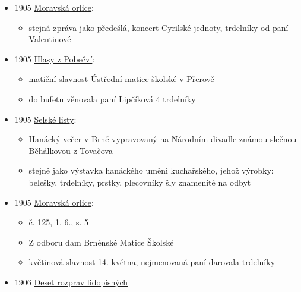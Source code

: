 \begin{itemize}
  \begin{itemize}
  \tightlist
  \item
    Dopisy. Ze Židlochovic.
  \item
    v neděli 30. dubna pořádala Cyrilská jednota koncert, bylo tam
    jídlo, paní Valentinová věnovala trdelníky
  \end{itemize}
\item
  1905
  \href{https://www.digitalniknihovna.cz/mzk/uuid/uuid:e7a3e0e0-6265-11df-9a5a-000d606f5dc6}{Moravská
  orlice}:

  \begin{itemize}
  \tightlist
  \item
    stejná zpráva jako předešlá, koncert Cyrilské jednoty, trdelníky od
    paní Valentinové
  \end{itemize}
\item
  1905
  \href{https://www.digitalniknihovna.cz/vkol/uuid/uuid:21149904-31a4-41d4-b6ba-93c1f08dc0d4}{Hlasy
  z Pobečví}:

  \begin{itemize}
  \tightlist
  \item
    matiční slavnost Ústřední matice školské v Přerově
  \item
    do bufetu věnovala paní Lipčíková 4 trdelníky
  \end{itemize}
\item
  1905
  \href{https://www.digitalniknihovna.cz/vkol/uuid/uuid:7df329c4-8e40-4856-b414-4b12b31f9d3c}{Selské
  listy}:

  \begin{itemize}
  \tightlist
  \item
    Hanácký večer v Brně vypravovaný na Národním divadle známou slečnou
    Běhálkovou z Tovačova
  \item
    stejně jako výstavka hanáckého uměni kuchařského, jehož výrobky:
    belešky, trdelníky, prstky, plecovníky šly znamenitě na odbyt
  \end{itemize}
\item
  1905
  \href{https://www.digitalniknihovna.cz/mzk/uuid/uuid:8e78cdd0-6258-11df-ae35-000d606f5dc6}{Moravská
  orlice}:

  \begin{itemize}
  \tightlist
  \item
    č. 125, 1. 6., s. 5
  \item
    Z odboru dam Brněnské Matice Školské
  \item
    květinová slavnost 14. května, nejmenovaná paní darovala trdelníky
  \end{itemize}
\item
  1906
  \href{https://ceskadigitalniknihovna.cz/uuid/uuid:50b3ac32-1b3f-4639-9f61-c01f3883690d}{Deset
  rozprav lidopisných}


\end{itemize}
